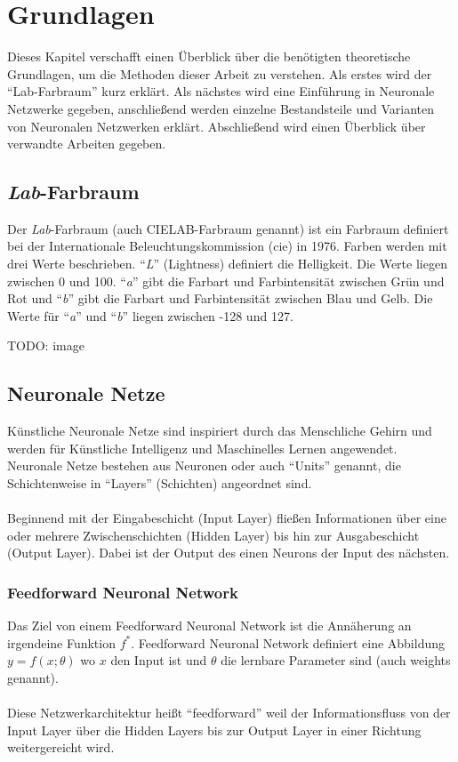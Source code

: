 \chapter{Grundlagen}
Dieses Kapitel verschafft einen Überblick über die benötigten theoretische Grundlagen, um die Methoden dieser Arbeit zu verstehen. Als
erstes wird der ``Lab-Farbraum'' kurz erklärt. Als nächstes wird eine Einführung in Neuronale Netzwerke gegeben, anschließend werden
einzelne Bestandsteile und Varianten von Neuronalen Netzwerken erklärt. Abschließend wird einen Überblick über verwandte Arbeiten gegeben.

\section{\textit{Lab}-Farbraum} 
Der \textit{Lab}-Farbraum (auch CIELAB-Farbraum genannt) ist ein Farbraum definiert bei der Internationale
Beleuchtungskommission (\gls{cie}) in 1976. Farben werden mit drei Werte beschrieben. ``\textit{L}'' (Lightness) definiert die Helligkeit.
Die Werte liegen zwischen 0 und 100. ``\textit{a}'' gibt die Farbart und Farbintensität zwischen Grün und Rot und ``\textit{b}'' gibt die
Farbart und Farbintensität zwischen Blau und Gelb. Die Werte für ``\textit{a}'' und ``\textit{b}'' liegen zwischen -128 und 127.

TODO: image

\section{Neuronale Netze}
Künstliche Neuronale Netze sind inspiriert durch das Menschliche Gehirn und werden für Künstliche Intelligenz und Maschinelles Lernen
angewendet. Neuronale Netze bestehen aus Neuronen oder auch ``Units'' genannt, die Schichtenweise in ``Layers'' (Schichten) angeordnet sind.
\\
\\
Beginnend mit der Eingabeschicht (Input Layer) fließen Informationen über eine oder mehrere Zwischenschichten (Hidden Layer) bis hin zur 
Ausgabeschicht (Output Layer). Dabei ist der Output des einen Neurons der Input des nächsten. \cite{neuronale-netze-aufbau}

\subsection{Feedforward Neuronal Network}
Das Ziel von einem Feedforward Neuronal Network ist die Annäherung an irgendeine Funktion $ f^* $. Feedforward Neuronal Network definiert 
eine Abbildung $ y = f(x;\theta) $ wo $ x $ den Input ist und $ \theta $ die lernbare Parameter sind (auch weights genannt).
\cite[164-223]{Goodfellow-et-al-2016}
\\
\\
Diese Netzwerkarchitektur heißt ``feedforward'' weil der Informationsfluss von der Input Layer über die Hidden Layers bis zur Output Layer 
in einer Richtung weitergereicht wird.

